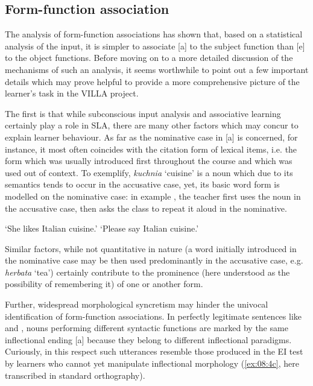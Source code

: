 \subsection{Form-function association}\label{sec:08:1.2}

The analysis of form-function associations has shown that, based on a statistical analysis of the input, it is simpler to associate [a] to the subject function than [e] to the object functions. Before moving on to a more detailed discussion of the mechanisms of such an analysis, it seems worthwhile to point out a few important details which may prove helpful to provide a more comprehensive picture of the learner’s task in the VILLA project.

The first is that while subconscious input analysis and associative learning certainly play a role in SLA, there are many other factors which may concur to explain learner behaviour. As far as the nominative case in [a] is concerned, for instance, it most often coincides with the citation form of lexical items, i.e. the form which was usually introduced first throughout the course and which was used out of context. To exemplify, \textit{kuchnia} ‘cuisine’ is a noun which due to its semantics tends to occur in the accusative case, yet, its basic word form is modelled on the nominative case: in example , the teacher first uses the noun in the accusative case, then asks the class to repeat it aloud in the nominative.

\ea%
    \label{ex:08:3}
    \glt    ‘She likes Italian cuisine.’
    \glt    ‘Please say Italian cuisine.’
    \z
\z

Similar factors, while not quantitative in nature (a word initially introduced in the nominative case may be then used predominantly in the accusative case, e.g. \textit{herbata} ‘tea’) certainly contribute to the prominence (here understood as the possibility of remembering it) of one or another form. 

Further, widespread morphological syncretism may hinder the univocal identification of form-function associations. In perfectly legitimate sentences like  and  , nouns performing different syntactic functions are marked by the same inflectional ending [a] because they belong to different inflectional paradigms. Curiously, in this respect such utterances resemble those produced in the EI test by learners who cannot yet manipulate inflectional morphology (\ref{ex:08:4c}, here transcribed in standard orthography).

